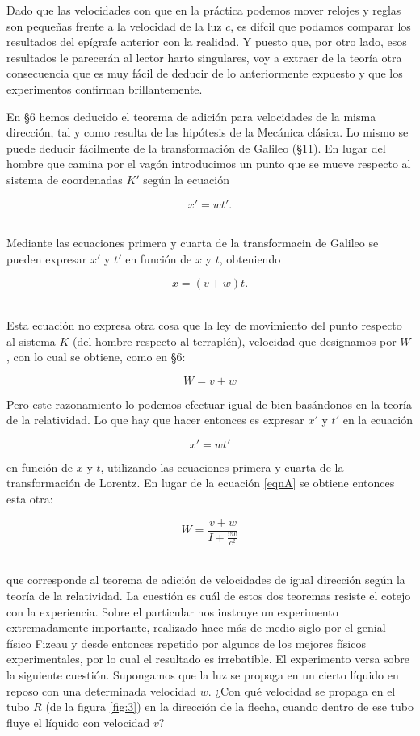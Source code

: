\documentclass[spanish]{book}
\begin{document}
Dado que las velocidades con que en la práctica podemos mover relojes y reglas son
pequeñas frente a la velocidad de la luz $c$, es difcil que podamos comparar los
resultados del epígrafe anterior con la realidad. Y puesto que, por otro lado, esos
resultados le parecerán al lector harto singulares, voy a extraer de la teoría otra
consecuencia que es muy fácil de deducir de lo anteriormente expuesto y que los
experimentos confirman brillantemente.
  
En \S 6 hemos deducido el teorema de adición para velocidades de la misma
dirección, tal y como resulta de las hipótesis de la Mecánica clásica. Lo mismo se
puede deducir fácilmente de la transformación de Galileo (\S 11). En lugar del hombre
que camina por el vagón introducimos un punto que se mueve respecto al sistema de
coordenadas $K'$ según la ecuación

\[x'=wt'.\]
 ~

Mediante las ecuaciones primera y cuarta de la transformacin de Galileo se pueden
expresar $x'$ y $t'$ en función de $x$ y $t$, obteniendo

\[x=(v+w)t.\]
 ~

Esta ecuación no expresa otra cosa que la ley de movimiento del punto respecto al
sistema $K$ (del hombre respecto al terraplén), velocidad que designamos por $W$, con
lo cual se obtiene, como en \S 6:

\begin{equation}
W=v+w\label{eqnA}
\end{equation}

Pero este razonamiento lo podemos efectuar igual de bien basándonos en la teoría de
la relatividad. Lo que hay que hacer entonces es expresar $x'$ y $t'$ en la ecuación

\begin{equation}
x'=wt'\label{eqnB}
\end{equation}

\noindent en función de $x$ y $t$, utilizando las ecuaciones primera y cuarta de la transformación de
Lorentz. En lugar de la ecuación \ref{eqnA} se obtiene entonces esta otra:

\[W=\frac{v+w}{I+\frac{vw}{c^{2}}}\]
 ~

\noindent que corresponde al teorema de adición de velocidades de igual dirección según la teoría
de la relatividad. La cuestión es cuál de estos dos teoremas resiste el cotejo con la
experiencia. Sobre el particular nos instruye un experimento extremadamente
importante, realizado hace más de medio siglo por el genial físico Fizeau y desde
entonces repetido por algunos de los mejores físicos experimentales, por lo cual el
resultado es irrebatible. El experimento versa sobre la siguiente cuestión. Supongamos
que la luz se propaga en un cierto líquido en reposo con una determinada velocidad $w$.
¿Con qué velocidad se propaga en el tubo $R$ (de la figura \ref{fig:3}) en la dirección de la flecha,
cuando dentro de ese tubo fluye el líquido con velocidad $v$?
\end{document}
